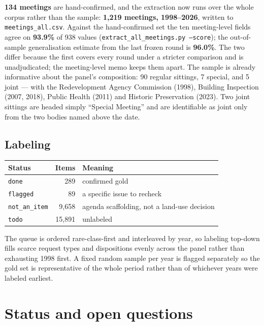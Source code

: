 \documentclass[11pt]{article}
\begin{document}
\textbf{134 meetings} are hand-confirmed, and the extraction now runs over the whole
corpus rather than the sample: \textbf{1{,}219 meetings, 1998--2026}, written to
\texttt{meetings\_all.csv}. Against the hand-confirmed set the ten meeting-level fields
agree on \textbf{93.9\%} of 938 values (\texttt{extract\_all\_meetings.py --score}); the
out-of-sample generalisation estimate from the last frozen round is \textbf{96.0\%}. The two
differ because the first covers every round under a stricter comparison and is
unadjudicated; the meeting-level memo keeps them apart. The sample is already informative about the panel's
composition: 90 regular sittings, 7 special, and 5 joint --- with the Redevelopment Agency
Commission (1998), Building Inspection (2007, 2018), Public Health (2011) and Historic
Preservation (2023). Two joint sittings are headed simply ``Special Meeting'' and are
identifiable as joint only from the two bodies named above the date.

\subsection{Labeling}

\begin{table}[h]
\centering
\begin{tabular}{lrl}
\toprule
Status & Items & Meaning \\
\midrule
\texttt{done} & 289 & confirmed gold \\
\texttt{flagged} & 89 & a specific issue to recheck \\
\texttt{not\_an\_item} & 9{,}658 & agenda scaffolding, not a land-use decision \\
\texttt{todo} & 15{,}891 & unlabeled \\
\bottomrule
\end{tabular}
\end{table}

The queue is ordered rare-class-first and interleaved by year, so labeling top-down fills
scarce request types and dispositions evenly across the panel rather than exhausting 1998
first. A fixed random sample per year is flagged separately so the gold set is
representative of the whole period rather than of whichever years were labeled earliest.

\section{Status and open questions}
\end{document}
